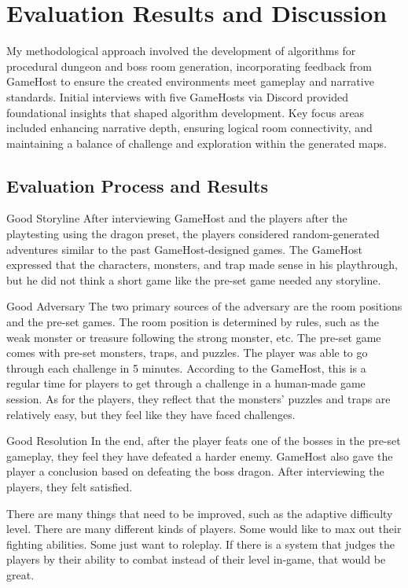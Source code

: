 \documentclass[10pt,twocolumn]{article}
\begin{document}
 


\section{Evaluation Results and Discussion}
My methodological approach involved the development of algorithms for procedural dungeon and boss room generation, incorporating feedback from GameHost to ensure the created environments meet gameplay and narrative standards. Initial interviews with five GameHosts via Discord provided foundational insights that shaped algorithm development. Key focus areas included enhancing narrative depth, ensuring logical room connectivity, and maintaining a balance of challenge and exploration within the generated maps.


\subsection{Evaluation Process and Results}
Good Storyline
         After interviewing GameHost and the players after the playtesting using the dragon preset, the players considered random-generated adventures similar to the past GameHost-designed games. The GameHost expressed that the characters, monsters, and trap made sense in his playthrough, but he did not think a short game like the pre-set game needed any storyline.


Good Adversary
       The two primary sources of the adversary are the room positions and the pre-set games. The room position is determined by rules, such as the weak monster or treasure following the strong monster, etc. The pre-set game comes with pre-set monsters, traps, and puzzles. The player was able to go through each challenge in 5 minutes. According to the GameHost, this is a regular time for players to get through a challenge in a human-made game session. As for the players, they reflect that the monsters’ puzzles and traps are relatively easy, but they feel like they have faced challenges.


Good Resolution
       In the end, after the player feats one of the bosses in the pre-set gameplay, they feel they have defeated a harder enemy. GameHost also gave the player a conclusion based on defeating the boss dragon. After interviewing the players, they felt satisfied.

There are many things that need to be improved, such as the adaptive difficulty level. There are many different kinds of players. Some would like to max out their fighting abilities. Some just want to roleplay. If there is a system that judges the players by their ability to combat instead of their level in-game, that would be great.
\end{document}
